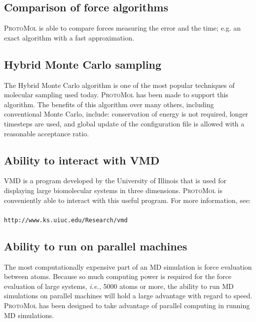\documentclass[11pt]{report}
\newcommand{\ProtoMol}{\textsc{ProtoMol }}
\providecommand{\ttsmall}[1]{\texttt{\small\mbox{#1}}}
\begin{document}
\subsection{Comparison of force algorithms}

\ProtoMol is able to compare forces measuring the error and the time;
e.g. an exact algorithm with a fast approximation.


\subsection{Hybrid Monte Carlo sampling}

The Hybrid Monte Carlo algorithm is one of the most popular techniques
of molecular sampling used today.  \ProtoMol has been made to support
this algorithm.  The benefits of this algorithm over many others,
including conventional Monte Carlo, include: conservation of energy is
not required, longer timesteps are used, and global update of the
configuration file is allowed with a reasonable acceptance ratio.

\subsection{Ability to interact with VMD}

VMD is a program developed by the University of Illinois that is used
for displaying large biomolecular systems in three
dimensions. \ProtoMol is conveniently able to interact with this
useful program. For more information, see:\\
\\
\ttsmall{http://www.ks.uiuc.edu/Research/vmd}

\subsection{Ability to run on parallel machines}

The most computationally expensive part of an MD simulation is force
evaluation between atoms.  Because so much computing power is required
for the force evaluation of large systems, {\it i.e.,} 5000 atoms or
more, the ability to run MD simulations on parallel machines will hold
a large advantage with regard to speed.  \ProtoMol has been designed
to take advantage of parallel computing in running MD simulations.
\end{document}
